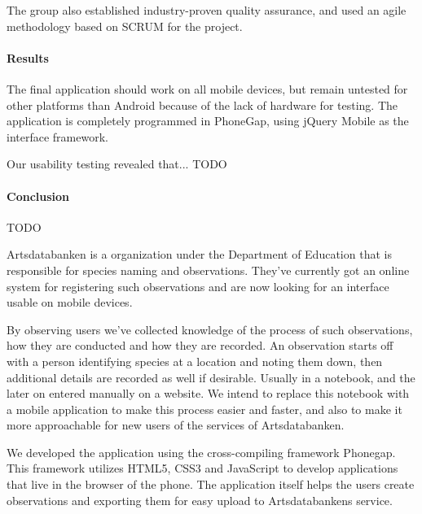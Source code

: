 The group also established industry-proven quality assurance, and used an agile
methodology based on SCRUM for the project. 

\paragraph{Results}
The final application should work on all mobile devices, but remain untested for
other platforms than Android because of the lack of hardware for testing. The
application is completely programmed in PhoneGap, using jQuery Mobile as the
interface framework.

Our usability testing revealed that... TODO

\paragraph{Conclusion}
TODO


Artsdatabanken is a organization under the Department of Education that is
responsible for species naming and observations. They’ve currently got an online
system for registering such observations and are now looking for an interface
usable on mobile devices.

By observing users we’ve collected knowledge of the process of such
observations, how they are conducted and how they are recorded. An observation
starts off with a person identifying species at a location and noting them down,
then additional details are recorded as well if desirable. Usually in a
notebook, and the later on entered manually on a website. We intend to replace
this notebook with a mobile application to make this process easier and faster,
and also to make it more approachable for new users of the services of
Artsdatabanken.

We developed the application using the cross-compiling framework Phonegap. This
framework utilizes HTML5, CSS3 and JavaScript to develop applications that live
in the browser of the phone. The application itself helps the users create
observations and exporting them for easy upload to Artsdatabankens service. 
